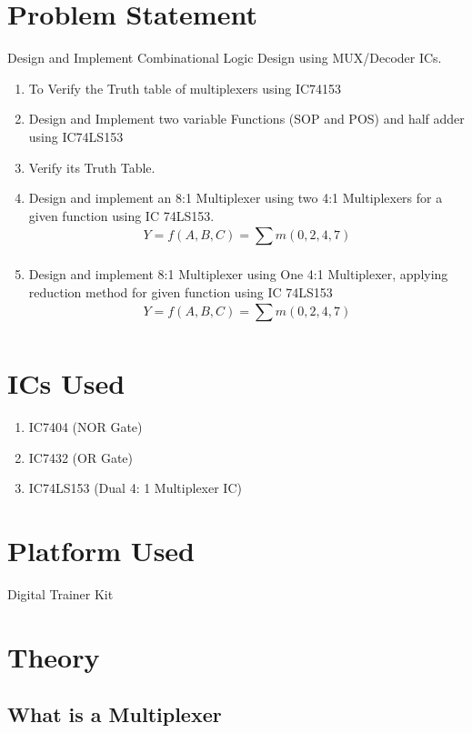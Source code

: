 \documentclass[11pt]{article}
\begin{document}
\tableofcontents
\thispagestyle{empty}
\clearpage


\setcounter{page}{1}

\section{Problem Statement}
Design and Implement Combinational Logic Design using MUX/Decoder ICs.

\begin{enumerate}
	\item To Verify the Truth table of multiplexers using IC74153
	\item Design and Implement two variable Functions (SOP and POS) and half adder using IC74LS153
	\item Verify its Truth Table.
	\item Design and implement an 8:1 Multiplexer using two 4:1 Multiplexers for a given function using IC 74LS153.
	      $$
		      Y = f(A, B, C) = \displaystyle\sum_{}^{} m(0, 2, 4, 7)
	      $$
	\item Design and implement 8:1 Multiplexer using One 4:1 Multiplexer, applying reduction method for given function using IC 74LS153
	      $$
		      Y = f(A, B, C) = \displaystyle\sum_{}^{} m(0, 2, 4, 7)
	      $$
\end{enumerate}

\section{ICs Used}

\begin{enumerate}
	\item IC7404 (NOR Gate)
	\item IC7432 (OR Gate)
	\item IC74LS153 (Dual 4: 1 Multiplexer IC)
\end{enumerate}

\section{Platform Used}
Digital Trainer Kit

\section{Theory}

\subsection{What is a Multiplexer}
\end{document}
